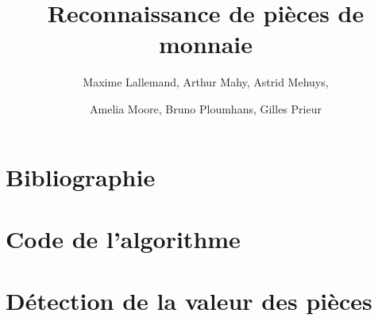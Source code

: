 \documentclass[12pt,titlepage]{article}
\begin{document}
\title{Reconnaissance de pièces de monnaie}
\author{Maxime Lallemand, Arthur Mahy, Astrid Mehuys, \and Amelia Moore, Bruno Ploumhans, Gilles Prieur}

\maketitle

\tableofcontents
\newpage







\appendix

\section{Bibliographie}
\section{Code de l'algorithme}

\section{Détection de la valeur des pièces}
\end{document}
